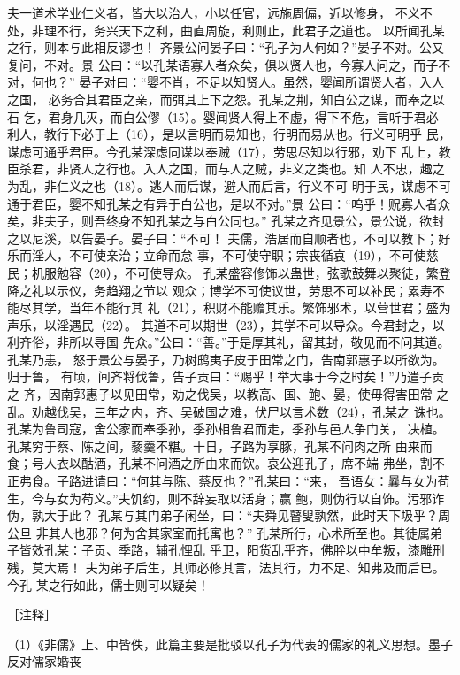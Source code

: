 \documentclass[12pt,UTF8]{ctexbook}
\begin{document}
夫一道术学业仁义者，皆大以治人，小以任官，远施周偏，近以修身， 
不义不处，非理不行，务兴天下之利，曲直周旋，利则止，此君子之道也。 
以所闻孔某之行，则本与此相反谬也！ 
齐景公问晏子曰：“孔子为人何如？”晏子不对。公又复问，不对。景 
公曰：“以孔某语寡人者众矣，俱以贤人也，今寡人问之，而子不对，何也？” 
晏子对曰：“婴不肖，不足以知贤人。虽然，婴闻所谓贤人者，入人之国， 
必务合其君臣之亲，而弭其上下之怨。孔某之荆，知白公之谋，而奉之以石 
乞，君身几灭，而白公僇（15）。婴闻贤人得上不虚，得下不危，言听于君必 
利人，教行下必于上（16），是以言明而易知也，行明而易从也。行义可明乎 
民，谋虑可通乎君臣。今孔某深虑同谋以奉贼（17），劳思尽知以行邪，劝下 
乱上，教臣杀君，非贤人之行也。入人之国，而与人之贼，非义之类也。知 
人不忠，趣之为乱，非仁义之也（18）。逃人而后谋，避人而后言，行义不可 
明于民，谋虑不可通于君臣，婴不知孔某之有异于白公也，是以不对。”景 
公曰：“呜乎！贶寡人者众矣，非夫子，则吾终身不知孔某之与白公同也。” 
孔某之齐见景公，景公说，欲封之以尼溪，以告晏子。晏子曰：“不可！ 
夫儒，浩居而自顺者也，不可以教下；好乐而淫人，不可使亲治；立命而怠 
事，不可使守职；宗丧循哀（19），不可使慈民；机服勉容（20），不可使导众。 
孔某盛容修饰以蛊世，弦歌鼓舞以聚徒，繁登降之礼以示仪，务趋翔之节以 
观众；博学不可使议世，劳思不可以补民；累寿不能尽其学，当年不能行其 
礼（21），积财不能赡其乐。繁饰邪术，以营世君；盛为声乐，以淫遇民（22）。 
其道不可以期世（23），其学不可以导众。今君封之，以利齐俗，非所以导国 
先众。”公曰：“善。”于是厚其礼，留其封，敬见而不问其道。孔某乃恚， 
怒于景公与晏子，乃树鸱夷子皮于田常之门，告南郭惠子以所欲为。归于鲁， 
有顷，间齐将伐鲁，告子贡曰：“赐乎！举大事于今之时矣！”乃遣子贡之 
齐，因南郭惠子以见田常，劝之伐吴，以教高、国、鲍、晏，使毋得害田常 
之乱。劝越伐吴，三年之内，齐、吴破国之难，伏尸以言术数（24），孔某之 
诛也。 
孔某为鲁司寇，舍公家而奉季孙，季孙相鲁君而走，季孙与邑人争门关， 
决植。 
孔某穷于蔡、陈之间，藜羹不糂。十日，子路为享豚，孔某不问肉之所 
由来而食；号人衣以酤酒，孔某不问酒之所由来而饮。哀公迎孔子，席不端 
弗坐，割不正弗食。子路进请曰：“何其与陈、蔡反也？”孔某曰：“来， 
吾语女：曩与女为苟生，今与女为苟义。”夫饥约，则不辞妄取以活身；赢 
鲍，则伪行以自饰。污邪诈伪，孰大于此？ 
孔某与其门弟子闲坐，曰：“夫舜见瞽叟孰然，此时天下圾乎？周公旦 
非其人也邪？何为舍其家室而托寓也？” 
孔某所行，心术所至也。其徒属弟子皆效孔某：子贡、季路，辅孔悝乱 
乎卫，阳货乱乎齐，佛肸以中牟叛，漆雕刑残，莫大焉！ 
夫为弟子后生，其师必修其言，法其行，力不足、知弗及而后已。今孔 
某之行如此，儒士则可以疑矣！ 


［注释］ 

（1）《非儒》上、中皆佚，此篇主要是批驳以孔子为代表的儒家的礼义思想。墨子反对儒家婚丧 
\end{document}
